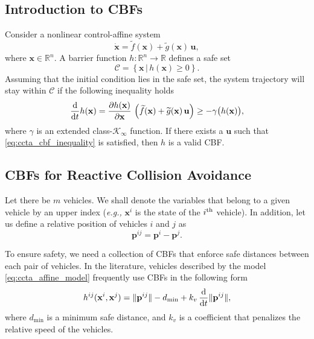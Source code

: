 \subsection{Introduction to CBFs}
Consider a nonlinear control-affine system
\begin{equation}
    \dot{\mathbf{x}} = \widetilde{f}(\mathbf{x}) + \widetilde{g}(\mathbf{x})\,\mathbf{u},
\end{equation}
\noindent where $\mathbf{x} \in \mathbb{R}^n$.
A barrier function $h : \mathbb{R}^{n} \rightarrow \mathbb{R}$ defines a safe set
\begin{equation}
    \mathcal{C} = \left\{ \mathbf{x} \,|\, h(\mathbf{x}) \geq 0 \right\}.
\end{equation}
Assuming that the initial condition lies in the safe set, the system trajectory will stay within $\mathcal{C}$ if the following inequality holds \cite{ames_control_2019}
\begin{equation}
    \frac{{\rm d}}{{\rm d}t}h(\mathbf{x}) = \frac{\partial h(\mathbf{x})}{\partial \mathbf{x}}\,\left(\widetilde{f}(\mathbf{x}) + \widetilde{g}(\mathbf{x})\,\mathbf{u}\right) \geq - \gamma\bigl(h(\mathbf{x})\bigr),
    \label{eq:ccta_cbf_inequality}
\end{equation}
where $\gamma$ is an extended class-$\mathcal{K}_{\infty}$ function. 
If there exists a $\mathbf{u}$ such that \eqref{eq:ccta_cbf_inequality} is satisfied, then $h$ is a valid CBF.%

\subsection{CBFs for Reactive Collision Avoidance}
Let there be $m$ vehicles.
We shall denote the variables that belong to a given vehicle by an upper index (\emph{e.g.,} $\mathbf{x}^{i}$ is the state of the $i^{\rm th}$ vehicle).
In addition, let us define a relative position of vehicles $i$ and $j$ as
\begin{equation}
    \mathbf{p}^{ij} = \mathbf{p}^{i} - \mathbf{p}^{j}.
    \label{eq:ccta_p_ij}
\end{equation}

To ensure safety, we need a collection of CBFs that enforce safe distances between each pair of vehicles.
In the literature, vehicles described by the model \eqref{eq:ccta_affine_model} frequently use CBFs in the following form \cite{basso_safety-critical_2020,thyri_reactive_2020}
\begin{equation}
    h^{ij}(\mathbf{x}^{i}, \mathbf{x}^{j}) = \|\mathbf{p}^{ij}\| - d_{\min} + k_v\,\frac{\rm d}{{\rm d}t}\|\mathbf{p}^{ij}\|,
    \label{eq:ccta_CBF}
\end{equation}
where $d_{\min}$ is a minimum safe distance, and $k_v$ is a coefficient that penalizes the relative speed of the vehicles.

